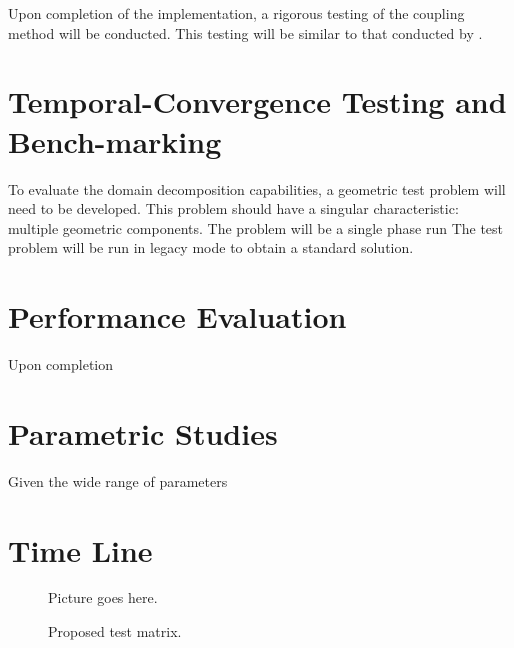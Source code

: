 Upon completion of the implementation, a rigorous testing of the coupling method will be conducted.
This testing will be similar to that conducted by \citet{Weaver2002}.

\section{Temporal-Convergence Testing and Bench-marking}
\label{sect:proposal_temporal_testing}
To evaluate the domain decomposition capabilities, a geometric test problem will need to be developed.
This problem should have a singular characteristic: multiple geometric components.
The problem will be a single phase run
The test problem will be run in legacy mode to obtain a standard solution.

\section{Performance Evaluation}
\label{sect:proposal_performance_evaluation}
Upon completion 

\section{Parametric Studies}
\label{sect:proposal_parametric_studies}
Given the wide range of parameters

\section{Time Line}
\label{sect:proposal_time_line}



\begin{figure}[ht]
\caption{Proposed test matrix.}
\label{fig:time_line}
\begin{center}
Picture goes here.
\end{center}
\end{figure}

